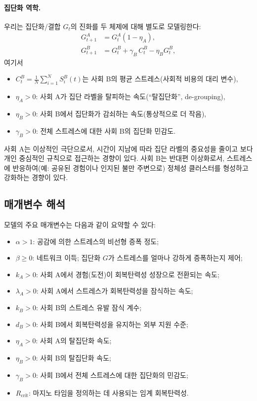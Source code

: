 \documentclass[11pt]{article}
\theoremstyle{plain}
\begin{document}
\paragraph{집단화 역학.}
우리는 집단화/결합 $G_t$의 진화를 두 체제에 대해 별도로 모델링한다:
\begin{align}
G_{t+1}^A &= G_t^A (1 - \eta_A), \label{eq:GA}\\
G_{t+1}^B &= G_t^B + \gamma_B\, C_t^B - \eta_B G_t^B, \label{eq:GB}
\end{align}
여기서
\begin{itemize}
  \item $C_t^B = \frac{1}{N} \sum_{i=1}^N S_i^B(t)$는 사회 B의 평균 스트레스(사회적 비용의 대리 변수),
  \item $\eta_A > 0$: 사회 A가 집단 라벨을 탈피하는 속도(``탈집단화'', de-grouping),
  \item $\eta_B > 0$: 사회 B에서 집단화가 감쇠하는 속도(통상적으로 더 작음),
  \item $\gamma_B > 0$: 전체 스트레스에 대한 사회 B의 집단화 민감도.
\end{itemize}

사회 A는 이상적인 극단으로서, 시간이 지남에 따라 집단 라벨의 중요성을 줄이고 보다 개인 중심적인 규칙으로 접근하는 경향이 있다.
사회 B는 반대편 이상화로서, 스트레스에 반응하여(예: 공유된 경험이나 인지된 불만 주변으로) 정체성 클러스터를 형성하고 강화하는 경향이 있다.

\subsection{매개변수 해석}

모델의 주요 매개변수는 다음과 같이 요약할 수 있다:
\begin{itemize}
  \item $\alpha > 1$: 공감에 의한 스트레스의 비선형 증폭 정도;
  \item $\beta \ge 0$: 네트워크 이득; 집단화 $G$가 스트레스를 얼마나 강하게 증폭하는지 제어;
  \item $k_A > 0$: 사회 A에서 경험(도전)이 회복탄력성 성장으로 전환되는 속도;
  \item $\lambda_A > 0$: 사회 A에서 스트레스가 회복탄력성을 잠식하는 속도;
  \item $k_B > 0$: 사회 B의 스트레스 유발 잠식 계수;
  \item $d_B > 0$: 사회 B에서 회복탄력성을 유지하는 외부 지원 수준;
  \item $\eta_A > 0$: 사회 A의 탈집단화 속도;
  \item $\eta_B > 0$: 사회 B의 탈집단화 속도;
  \item $\gamma_B > 0$: 사회 B에서 전체 스트레스에 대한 집단화의 민감도;
  \item $R_{\text{crit}}$: 마지노 타임을 정의하는 데 사용되는 임계 회복탄력성.
\end{itemize}
\end{document}

